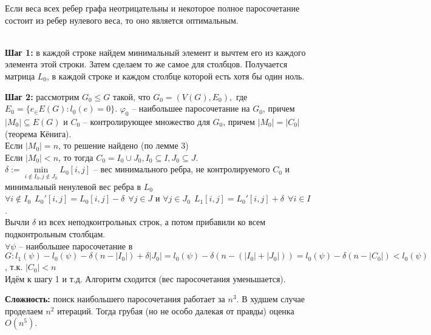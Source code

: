 	\begin{Lm}
		Если веса всех ребер графа неотрицательны и некоторое полное паросочетание состоит из ребер нулевого
		веса, то оно является оптимальным.  
	\end{Lm}

	\\
	\textbf{Шаг 1:} в каждой строке найдем минимальный элемент и вычтем его из каждого элемента этой строки. Затем сделаем то же самое 
	для столбцов. Получается матрица $L_0$, в каждой строке и каждом столбце которой есть хотя бы один ноль. 

	\textbf{Шаг 2:} рассмотрим $G_0 \leqslant G$ такой, что $G_0 = (V(G), E_0),$ где $E_0 = 
	\{e_ \in E(G): l_0(e) = 0\}$. $\varphi_0$ -- наибольшее паросочетание на $G_0$, причем $|M_0|
	\subseteq E(G)$ и $C_0$ -- контролирующее множество для $G_0$, причем $|M_0| = |C_0|$ (теорема Кёнига).\\
	Если $|M_0| = n$, то решение найдено (по лемме 3)\\
	Если $|M_0| < n$, то тогда $C_0 = I_0 \cup J_0, I_0 \subseteq I, J_0 \subseteq J$.\\ 
	$\delta := \underset{i \notin I_0, j \notin J_0}{\min} L_0[i,j]$ -- вес минимального ребра, не 
	контролируемого $C_0$ и минимальный ненулевой вес ребра в $L_0$\\
	$\forall i \notin I_0 \ \ L_0'[i,j] = L_0[i,j] - \delta \ \ \forall j \in J$ и 
	$\forall j \in J_0 \ \ L_1 [i,j] = L_0' [i,j] + \delta \ \ \forall i \in I$.\\
	Вычли $\delta$ из всех неподконтрольных строк, а потом прибавили ко всем подконтрольным столбцам.\\
	$\forall \psi$ -- наибольшее паросочетание в $G: l_1(\psi) - l_0(\psi) - \delta(n-|I_0|)
	+ \delta |J_0| = l_0(\psi) - \delta(n - (|I_0| + |J_0|)) = l_0(\psi) - \delta (n - |C_0|)
	< l_0 (\psi)$, т.к. $|C_0| < n$\\
	Идём к шагу 1 и т.д. Алгоритм сходится (вес паросочетания уменьшается). 

	\textbf{Сложность:}  поиск наибольшего паросочетания работает за $n^3$. В худшем случае проделаем $n^2$ итераций. 
	Тогда грубая (но не особо далекая от правды) оценка $O(n^5)$.

